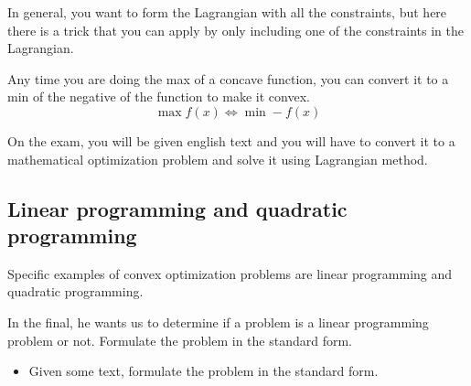 \begin{warning}
    In general, you want to form the Lagrangian with all the constraints, but here there is a trick that you can apply by only including one of the constraints in the Lagrangian.
\end{warning}

\begin{warning}
    Any time you are doing the max of a concave function, you can convert it to a min of the negative of the function to make it convex.
    \begin{equation*}
        \max f(x) \iff \min -f(x)
    \end{equation*}
\end{warning}

\begin{warning}
    On the exam, you will be given english text and you will have to convert it to a mathematical optimization problem and solve it using Lagrangian method.
\end{warning}

\subsection{Linear programming and quadratic programming}
\begin{intuition}
    Specific examples of convex optimization problems are linear programming and quadratic programming.
\end{intuition}

\begin{warning}
    In the final, he wants us to determine if a problem is a linear programming problem or not. Formulate the problem in the standard form.
    \begin{itemize}
        \item Given some text, formulate the problem in the standard form.
    \end{itemize}
\end{warning}

